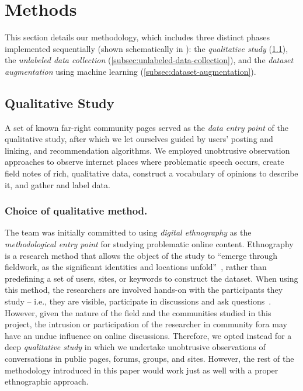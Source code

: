 

\section{Methods}

This section details our methodology, which includes three distinct phases implemented sequentially (shown schematically in ):
the \emph{qualitative study} (\cref{subsec:qual-study}),
the \emph{unlabeled data collection} (\cref{subsec:unlabeled-data-collection}), and
the \emph{dataset augmentation} using machine learning (\cref{subsec:dataset-augmentation}).


\subsection{Qualitative Study}
\label{subsec:qual-study}

A set of known far-right community pages served as the \emph{data entry point} of the qualitative study, after which we let ourselves guided by users' posting and linking, and recommendation algorithms.
We employed unobtrusive observation approaches to observe internet places where problematic speech occurs, create field notes of rich, qualitative data, construct a vocabulary of opinions to describe it, and gather and label data.

\subsubsection{Choice of qualitative method.}
The team was initially committed to using \emph{digital ethnography} as the \emph{methodological entry point} for studying problematic online content.
Ethnography is a research method that allows the object of the study to ``emerge through fieldwork, as the significant identities and locations unfold''~\citep{hine2015}, rather than predefining a set of users, sites, or keywords to construct the dataset.
When using this method, the researchers are involved hands-on with the participants they study -- i.e., they are visible, participate in discussions and ask questions~\citep{baym2009making}.
However, given the nature of the field and the communities studied in this project, the intrusion or participation of the researcher in community fora may have an undue influence on online discussions.
Therefore, we opted instead for a deep \emph{qualitative study} in which we undertake unobtrusive observations of conversations in public pages, forums, groups, and sites.
However, the rest of the methodology introduced in this paper would work just as well with a proper ethnographic approach.


